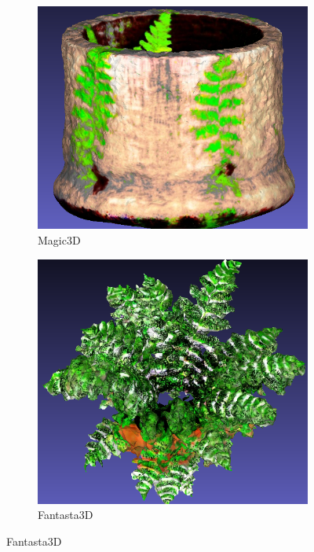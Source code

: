 \begin{figure}[ht]
\begin{subfigure}[b]{0.35\textwidth}
        \includegraphics[width=\textwidth]{etc/a high-quality rendering of a fern in a wooden pot/magic3d/magic3d_fern_result.png}
        \caption{Magic3D}
        \vspace{0.1cm}
    \end{subfigure}
    \begin{subfigure}[b]{0.32\textwidth}
        \centering
        \includegraphics[width=\textwidth]{etc/a high-quality rendering of a fern in a wooden pot/fantasia3d/fantasia_fern_result.png}
        \caption{Fantasta3D}
        \vspace{0.1cm}
    \end{subfigure}


\end{figure}

